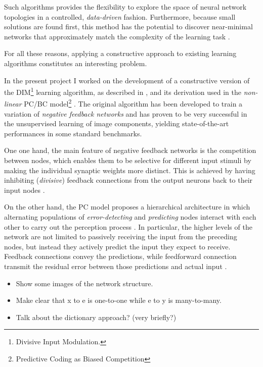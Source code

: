 \documentclass[11pt,a4paper]{report}
\begin{document}
		Such algorithms provides the flexibility to explore the space of neural network topologies in a controlled, \emph{data-driven} fashion. Furthermore, because small solutions are found first, this method has the potential to discover near-minimal networks that approximately match the complexity of the learning task \cite{parekh2000constructive}.
		
		For all these reasons, applying a constructive approach to existing learning algorithms constitutes an interesting problem.
		
		\newpage
		
		In the present project I worked on the development of a constructive version of the DIM\footnote{Divisive Input Modulation.} learning algorithm, as described in \cite{spratling2009unsupervised}, and its derivation \cite{spratling2012unsupervised} used in the \emph{non-linear} PC/BC model\footnote{Predictive Coding as Biased Competition} \cite{spratling2008predictive}. The original algorithm has been developed to train a variation of \emph{negative feedback networks} and has proven to be very successful in the unsupervised learning of image components, yielding state-of-the-art performances in some standard benchmarks.
		
		One one hand, the main feature of negative feedback networks is the competition between nodes, which enables them to be selective for different input stimuli by making the individual synaptic weights more distinct. This is achieved by having inhibiting (\emph{divisive}) feedback connections from the output neurons back to their input nodes \cite{spratling2009unsupervised}. 
		
		On the other hand, the PC model proposes a hierarchical architecture in which alternating populations of \emph{error-detecting} and \emph{predicting} nodes interact with each other to carry out the perception process \cite{spratling2014predictive}. In particular, the higher levels of the network are not limited to passively receiving the input from the preceding nodes, but instead they actively predict the input they expect to receive. Feedback connections convey the predictions, while feedforward connection transmit the residual error between those predictions and actual input \cite{spratling2008predictive}.

		\begin{itemize}
			\item Show some images of the network structure.
			\item Make clear that x to e is one-to-one while e to y is many-to-many.
			\item Talk about the dictionary approach? (very briefly?)
		\end{itemize}
\end{document}

